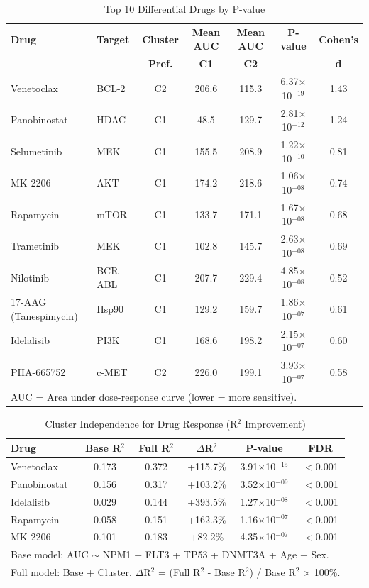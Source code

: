 \documentclass[11pt,a4paper]{article}
\begin{document}
\begin{table}[H]
\centering
\caption{Top 10 Differential Drugs by P-value}
\label{tab:drugs}
\small
\begin{tabular}{l l c c c c c}
\toprule
\textbf{Drug} & \textbf{Target} & \textbf{Cluster} & \textbf{Mean AUC} & \textbf{Mean AUC} & \textbf{P-value} & \textbf{Cohen's} \\
 &  & \textbf{Pref.} & \textbf{C1} & \textbf{C2} &  & \textbf{d} \\
\midrule
Venetoclax & BCL-2 & C2 & 206.6 & 115.3 & 6.37$\times$10$^{-19}$ & 1.43 \\
Panobinostat & HDAC & C1 & 48.5 & 129.7 & 2.81$\times$10$^{-12}$ & 1.24 \\
Selumetinib & MEK & C1 & 155.5 & 208.9 & 1.22$\times$10$^{-10}$ & 0.81 \\
MK-2206 & AKT & C1 & 174.2 & 218.6 & 1.06$\times$10$^{-08}$ & 0.74 \\
Rapamycin & mTOR & C1 & 133.7 & 171.1 & 1.67$\times$10$^{-08}$ & 0.68 \\
Trametinib & MEK & C1 & 102.8 & 145.7 & 2.63$\times$10$^{-08}$ & 0.69 \\
Nilotinib & BCR-ABL & C1 & 207.7 & 229.4 & 4.85$\times$10$^{-08}$ & 0.52 \\
17-AAG (Tanespimycin) & Hsp90 & C1 & 129.2 & 159.7 & 1.86$\times$10$^{-07}$ & 0.61 \\
Idelalisib & PI3K & C1 & 168.6 & 198.2 & 2.15$\times$10$^{-07}$ & 0.60 \\
PHA-665752 & c-MET & C2 & 226.0 & 199.1 & 3.93$\times$10$^{-07}$ & 0.58 \\
\bottomrule
\multicolumn{7}{l}{\small AUC = Area under dose-response curve (lower = more sensitive).}
\end{tabular}
\end{table}

\begin{table}[H]
\centering
\caption{Cluster Independence for Drug Response (R$^2$ Improvement)}
\label{tab:independence}
\small
\begin{tabular}{l c c c c c}
\toprule
\textbf{Drug} & \textbf{Base R$^2$} & \textbf{Full R$^2$} & \textbf{$\Delta$R$^2$} & \textbf{P-value} & \textbf{FDR} \\
\midrule
Venetoclax & 0.173 & 0.372 & +115.7\% & 3.91$\times$10$^{-15}$ & $<$0.001 \\
Panobinostat & 0.156 & 0.317 & +103.2\% & 3.52$\times$10$^{-09}$ & $<$0.001 \\
Idelalisib & 0.029 & 0.144 & +393.5\% & 1.27$\times$10$^{-08}$ & $<$0.001 \\
Rapamycin & 0.058 & 0.151 & +162.3\% & 1.16$\times$10$^{-07}$ & $<$0.001 \\
MK-2206 & 0.101 & 0.183 & +82.2\% & 4.35$\times$10$^{-07}$ & $<$0.001 \\
\bottomrule
\multicolumn{6}{l}{\small Base model: AUC $\sim$ NPM1 + FLT3 + TP53 + DNMT3A + Age + Sex.} \\
\multicolumn{6}{l}{\small Full model: Base + Cluster. $\Delta$R$^2$ = (Full R$^2$ - Base R$^2$) / Base R$^2$ $\times$ 100\%.}
\end{tabular}
\end{table}
\end{document}
